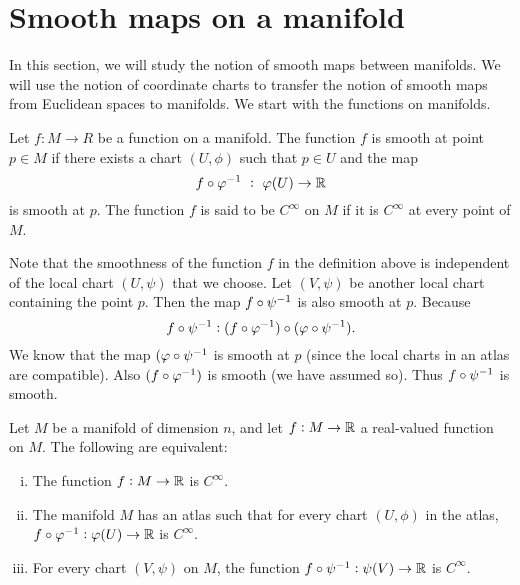 \section{Smooth maps on a manifold}
In this section, we will study the notion of smooth maps between manifolds. We will use the notion of coordinate charts to transfer the notion of smooth maps from Euclidean spaces to manifolds. We start with the functions on manifolds.

\begin{definition}
	Let $ f:M \to R $ be a function on a manifold. The function $ f $ is smooth at point $ p \in M $ if there exists a chart $ (U,\phi) $ such that $ p \in U $ and the map
	\[ f \circ \varphi^{-1}\ :\ \varphi(U) \to \mathbb{R} \]
	is smooth at $ p $. The function $ f $ is said to be $ C^\infty $ on $ M $ if it is $ C^\infty $ at every point of $ M $.
\end{definition}
\begin{remark} 
	Note that the smoothness of the function $ f $ in the definition above is independent of the local chart $ (U,\psi) $ that we choose. Let $ (V,\psi) $ be another local chart containing the point $ p $. Then the map $ f \circ \psi^{-1} $ is also smooth at $ p $. Because
	\[ f \circ \psi^{-1}: (f\circ \varphi^{-1}) \circ (\varphi \circ \psi^{-1}). \]
	We know that the map $ (\varphi \circ \psi^{-1} $ is smooth at $ p $ (since the local charts in an atlas are compatible). Also $ (f\circ \varphi^{-1}) $ is smooth (we have assumed so). Thus $ f \circ \psi^{-1} $ is smooth.
\end{remark}

\begin{proposition}
	Let $ M $ be a manifold of dimension $ n $, and let $ f: M \to \mathbb{R} $ a real-valued function on $ M $. The following are equivalent:
	\begin{enumerate}[(i)]
		\item The function $ f : M \to \mathbb{R} $ is $ C^\infty $.
		\item The manifold $ M $ has an atlas such that for every chart $ (U,\phi) $ in the atlas, $ f\circ \varphi^{-1}: \varphi(U) \to \mathbb{R}$ is $ C^\infty $.
		\item For every chart $ (V,\psi) $ on $ M $, the function $ f\circ \psi^{-1}: \psi(V) \to \mathbb{R} $ is $ C^\infty $.
	\end{enumerate}
\end{proposition}

